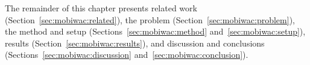 The remainder of this chapter presents related work (Section~\ref{sec:mobiwac:related}), the problem (Section~\ref{sec:mobiwac:problem}), the method and setup (Sections~\ref{sec:mobiwac:method} and~\ref{sec:mobiwac:setup}), results (Section~\ref{sec:mobiwac:results}), and discussion and conclusions (Sections~\ref{sec:mobiwac:discussion} and~\ref{sec:mobiwac:conclusion}).
